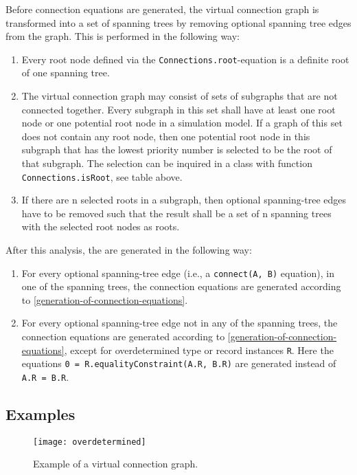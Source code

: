 Before connection equations are generated, the virtual connection graph is transformed into a set of spanning trees by removing optional spanning tree edges from the graph.
This is performed in the following way:
\begin{enumerate}
\item
  Every root node defined via the \lstinline!Connections.root!-equation is a definite root of one spanning tree.
\item
  The virtual connection graph may consist of sets of subgraphs that are not connected together.
  Every subgraph in this set shall have at least one root node or one potential root node in a simulation model.
  If a graph of this set does not contain any root node, then one potential root node in this subgraph that has the lowest priority number is selected to be the root of that subgraph.
  The selection can be inquired in a class with function \lstinline!Connections.isRoot!, see table above.
\item
  If there are n selected roots in a subgraph, then optional spanning-tree edges have to be removed such that the result shall be a set of n spanning trees with the selected root nodes as roots.
\end{enumerate}

After this analysis, the  are generated in the following way:
\begin{enumerate}
\item
  For every optional spanning-tree edge (i.e., a \lstinline!connect(A, B)! equation), in one of the spanning trees, the connection equations are generated according to \cref{generation-of-connection-equations}.
\item
  For every optional spanning-tree edge not in any of the spanning trees, the connection equations are generated according to \cref{generation-of-connection-equations}, except for overdetermined type or record instances \lstinline!R!.
  Here the equations \lstinline!0 = R.equalityConstraint(A.R, B.R)! are generated instead of \lstinline!A.R = B.R!.
\end{enumerate}

\subsection{Examples}\label{examples-of-overconstrained-connectors}

\begin{example}
\begin{figure}[H]
  \begin{center}
    \texttt{[image: overdetermined]}
  \end{center}
  \caption{Example of a virtual connection graph.}
\end{figure}
\end{example}

